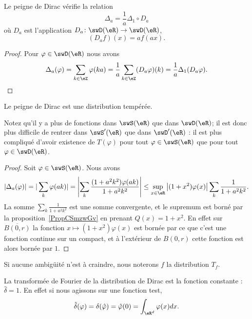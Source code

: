 \begin{lemma}
	Le peigne de Dirac vérifie la relation
	\begin{equation}
		\Delta_a=\frac{1}{ a }\Delta_1\circ D_a
	\end{equation}
	où \( D_a\) est l'application \( D_a\colon \swD(\eR)\to \swD(\eR)\),
	\begin{equation}
		(D_af)(x)=af(ax).
	\end{equation}
\end{lemma}

\begin{proof}
	Pour \( \varphi\in\swD(\eR)\) nous avons
	\begin{equation}
		\Delta_a(\varphi)=\sum_{k\in \eZ}\varphi(ka)=\frac{1}{ a }\sum_{k\in \eZ}(D_a\varphi)(k)=\frac{1}{ a }\Delta_1(D_a\varphi).
	\end{equation}
\end{proof}

\begin{proposition}
	Le peigne de Dirac est une distribution tempérée.
\end{proposition}

Notez qu'il y a plus de fonctions dans \( \swS(\eR)\) que dans \( \swD(\eR)\); il est donc plus difficile de rentrer dans \( \swS'(\eR)\) que dans \( \swD'(\eR)\) : il est plus compliqué d'avoir existence de \( T(\varphi)\) pour tout \( \varphi\in\swS(\eR)\) que pour tout \( \varphi\in\swD(\eR)\).

\begin{proof}
	Soit \( \varphi\in\swS(\eR)\). Nous avons
	\begin{equation}
		|\Delta_a(\varphi)|=| \sum_k\varphi(ak) |=\left| \sum_k\frac{ (1+a^2k^2)\varphi(ak) }{ 1+a^2k^2 } \right| \leq \sup_{x\in \eR}\big| (1+x^2)\varphi(x) \big|\sum_k\frac{1}{ 1+a^2k^2 }.
	\end{equation}
	La somme \( \sum_k\frac{1}{ 1+a^2k^2 }\) est une somme convergente, et le supremum est borné par la proposition~\ref{PropCSmzwGv} en prenant \( Q(x)=1+x^2\). En effet sur \( \overline{ B(0,r) }\) la fonction \( x\mapsto (1+x^2)\varphi(x)\) est bornée par ce que c'est une fonction continue sur un compact, et à l'extérieur de \( B(0,r)\) cette fonction est alors bornée par \( 1\).
\end{proof}

Si aucune ambigüité n'est à craindre, nous noterons \( f\) la distribution \( T_f\).

\begin{example}
	La transformée de Fourier de la distribution de Dirac est la fonction constante : \( \hat \delta=1\). En effet si nous agissons sur une fonction test,
	\begin{equation}
		\hat \delta(\varphi)=\delta(\hat \varphi)=\hat \varphi(0)=\int_{\eR^d}\varphi(x)dx.
	\end{equation}
\end{example}

